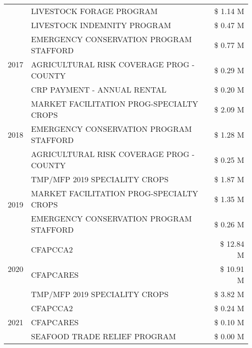 \begin{tabular}{llr}
 & LIVESTOCK FORAGE PROGRAM & \$ 1.14 M \\
 & LIVESTOCK INDEMNITY PROGRAM & \$ 0.47 M \\
\cline{1-3}
\multirow[t]{3}{*}{2017} & EMERGENCY CONSERVATION PROGRAM STAFFORD & \$ 0.77 M \\
 & AGRICULTURAL RISK COVERAGE PROG - COUNTY & \$ 0.29 M \\
 & CRP PAYMENT - ANNUAL RENTAL & \$ 0.20 M \\
\cline{1-3}
\multirow[t]{3}{*}{2018} & MARKET FACILITATION PROG-SPECIALTY CROPS & \$ 2.09 M \\
 & EMERGENCY CONSERVATION PROGRAM STAFFORD & \$ 1.28 M \\
 & AGRICULTURAL RISK COVERAGE PROG - COUNTY & \$ 0.25 M \\
\cline{1-3}
\multirow[t]{3}{*}{2019} & TMP/MFP 2019 SPECIALITY CROPS & \$ 1.87 M \\
 & MARKET FACILITATION PROG-SPECIALTY CROPS & \$ 1.35 M \\
 & EMERGENCY CONSERVATION PROGRAM STAFFORD & \$ 0.26 M \\
\cline{1-3}
\multirow[t]{3}{*}{2020} & CFAPCCA2 & \$ 12.84 M \\
 & CFAPCARES & \$ 10.91 M \\
 & TMP/MFP 2019 SPECIALITY CROPS & \$ 3.82 M \\
\cline{1-3}
\multirow[t]{3}{*}{2021} & CFAPCCA2 & \$ 0.24 M \\
 & CFAPCARES & \$ 0.10 M \\
 & SEAFOOD TRADE RELIEF PROGRAM & \$ 0.00 M \\
\cline{1-3}
\bottomrule
\end{tabular}

